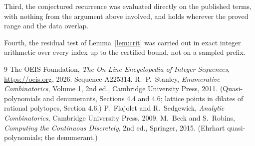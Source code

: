 \documentclass[11pt,a4paper]{article}
\theoremstyle{plain}
\theoremstyle{definition}
\begin{document}
Third, the conjectured recurrence was evaluated directly on the published terms, with
nothing from the argument above involved, and holds wherever the proved range and the data
overlap.

Fourth, the residual test of Lemma~\ref{lem:crit} was carried out in exact integer
arithmetic over every index up to the certified bound, not on a sampled prefix.

\begin{thebibliography}{9}
 The OEIS Foundation, \emph{The On-Line Encyclopedia of Integer
Sequences}, \url{https://oeis.org}, 2026. Sequence A225314.
 R.~P.~Stanley, \emph{Enumerative Combinatorics}, Volume 1, 2nd ed.,
Cambridge University Press, 2011. (Quasi-polynomials and denumerants, Sections 4.4 and 4.6;
lattice points in dilates of rational polytopes, Section 4.6.)
 P.~Flajolet and R.~Sedgewick, \emph{Analytic Combinatorics}, Cambridge
University Press, 2009.
 M.~Beck and S.~Robins, \emph{Computing the Continuous Discretely}, 2nd
ed., Springer, 2015. (Ehrhart quasi-polynomials; the denumerant.)
\end{thebibliography}
\end{document}
